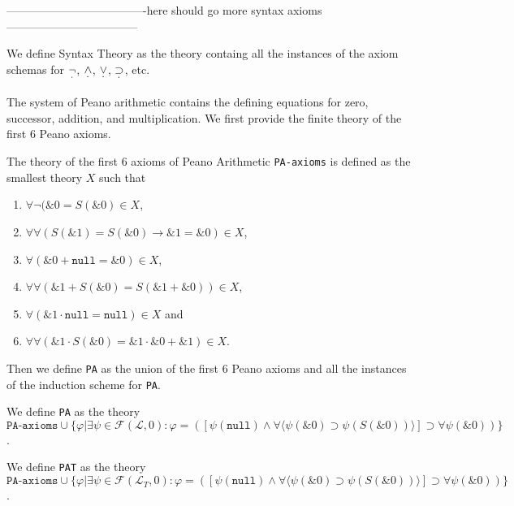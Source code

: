 -------------------------------------here should go more syntax axioms-----------------------------------

\begin{definition}\label{def:Syntax-Theory}
  \leanok
  We define Syntax Theory as the theory containg all the instances of the axiom schemas for $\underset{^{\boldsymbol{\cdot}}}{\neg}$, $\underset{^{\boldsymbol{\cdot}}}{\wedge}$, $\underset{^{\boldsymbol{\cdot}}}{\vee}$, $\underset{^{\boldsymbol{\cdot}}}{\supset}$, etc.
\end{definition}

The system of Peano arithmetic contains the defining equations for zero, successor, addition, and multiplication. We first provide the finite theory of the first 6 Peano axioms.
\begin{definition}\label{def:PA-Axioms}
  \leanok
    The theory of the first 6 axioms of Peano Arithmetic \texttt{PA-axioms} is defined as the smallest theory $X$ such that
    \begin{enumerate}
        \item $\forall \neg (\&0 = S(\&0) \in X$, 
        \item $\forall \forall (S(\&1) = S(\&0) \rightarrow \&1 = \&0) \in X$,
        \item $\forall (\&0 + \texttt{null} = \&0) \in X$,
        \item $\forall \forall (\&1 + S(\&0) = S(\&1 + \&0)) \in X$,
        \item $\forall (\&1 \cdot \texttt{null} = \texttt{null}) \in X$ and
        \item $\forall  \forall (\&1 \cdot S(\&0) = \&1 \cdot \&0 + \&1) \in X$.
    \end{enumerate}
\end{definition}

Then we define \texttt{PA} as the union of the first 6 Peano axioms and all the instances of the induction scheme for \texttt{PA}.
\begin{definition}\label{def:PA}
  \leanok
  We define \texttt{PA} as the theory $\texttt{PA-axioms} \cup \{φ | ∃ψ \in \mathcal{F}(\mathcal{L},{0}) : φ = ([ψ(\texttt{null}) \wedge ∀\langle ψ(\&0) \supset ψ(S(\&0)) \rangle ] \supset ∀ψ(\&0))\}$.
\end{definition}

\begin{definition}\label{def:PAT}
  \leanok
    We define \texttt{PAT} as the theory $\texttt{PA-axioms} \cup \{φ | ∃ψ \in \mathcal{F}(\mathcal{L}_T,{0}) : φ = ([ψ(\texttt{null}) \wedge ∀\langle ψ(\&0) \supset ψ(S(\&0)) \rangle ] \supset ∀ψ(\&0))\}$.
\end{definition}

